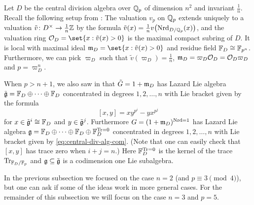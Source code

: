 Let $D$ be the central division algebra over $\mathbb{Q}_{p}$ of dimension $n^{2}$ and invariant $\frac{1}{n}$. Recall the following setup from \cite[Sect.~6.3]{Sor}: The valuation $v_{p}$ on $\mathbb{Q}_{p}$ extends uniquely to a valuation $\tilde{v} \colon D^{\times} \to \frac{1}{n}\mathbb{Z}$ by the formula $\tilde{v}(x) = \frac{1}{n}v\bigl(\operatorname{Nrd}_{D/\mathbb{Q}_{p}}(x)\bigr)$, and the valuation ring $\sO_{D} = \set{ x : \tilde{v}(x) >0 }$ is the maximal compact subring of $D$. It is local with maximal ideal $\idm_{D} = \set{ x : \tilde{v}(x) > 0 }$ and residue field $\mathbb{F}_{D} \cong \mathbb{F}_{p^{n}}$. Furthermore, we can pick $\varpi_{D}$ such that $\tilde{v}(\varpi_{D}) = \frac{1}{n}$, $\mathfrak{m}_{D} = \varpi_{D}\mathcal{O}_{D} = \mathcal{O}_{D}\varpi_{D}$ and $p = \varpi_{D}^{n}$.

When $p > n+1$, we also saw in \cite[Sect.~6.3]{Sor} that $\tilde{G} = 1 + \mathfrak{m}_{D}$ has Lazard Lie algebra $\tilde{\mathfrak{g}} = \mathbb{F}_{D} \oplus \dotsb \oplus \mathbb{F}_{D}$ concentrated in degrees $1,2,\dotsc,n$ with Lie bracket given by the formula
\begin{equation}\label{eq:central-div-alg-com}
  [x,y] = xy^{p^{i}} - yx^{p^{j}}
\end{equation}
for $x \in \tilde{\mathfrak{g}}^{i} \cong \mathbb{F}_{D}$ and $y \in \tilde{\mathfrak{g}}^{j}$. Furthermore $G = (1 + \mathfrak{m}_{D})^{\operatorname{Nrd} = 1}$ has Lazard Lie algebra $\mathfrak{g} = \mathbb{F}_{D} \oplus \dotsb \oplus \mathbb{F}_{D} \oplus \mathbb{F}_{D}^{\operatorname{Tr} = 0}$ concentrated in degrees $1,2,\dotsc,n$ with Lie bracket given by \eqref{eq:central-div-alg-com}. (Note that one can easily check that $[x,y]$ has trace zero when $i+j = n$.) Here $\mathbb{F}_{D}^{\operatorname{Tr} = 0}$ is the kernel of the trace $\operatorname{Tr}_{\mathbb{F}_{D}/\mathbb{F}_{p}}$ and $\mathfrak{g} \subseteq \tilde{\mathfrak{g}}$ is a codimension one Lie subalgebra.

In the previous subsection we focused on the case $n = 2$ (and $p \equiv 3 \pmod{4}$), but one can ask if some of the ideas work in more general cases. For the remainder of this subsection we will focus on the case $n = 3$ and $p = 5$.

